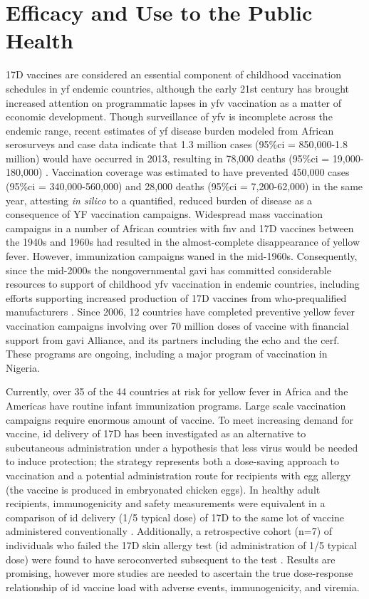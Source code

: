 \section{Efficacy and Use to the Public Health}
17D vaccines are considered an essential component of childhood vaccination schedules in \gls{yf} endemic countries, although the early 21st century has brought increased attention on programmatic lapses in \gls{yfv} vaccination as a matter of economic development. Though surveillance of \gls{yfv} is incomplete across the endemic range, recent estimates of \gls{yf} disease burden modeled from African serosurveys and case data indicate that 1.3 million cases (95\%\gls{ci} = 850,000-1.8 million) would have occurred in 2013, resulting in 78,000 deaths (95\%\gls{ci} = 19,000-180,000)  \parencite{Garske:2014dp}. Vaccination coverage was estimated to have prevented 450,000 cases (95\%\gls{ci} = 340,000-560,000) and 28,000 deaths (95\%\gls{ci} = 7,200-62,000) in the same year, attesting \emph{in silico} to a quantified, reduced burden of disease as a consequence of YF vaccination campaigns. Widespread mass vaccination campaigns in a number of African countries with \gls{fnv} and 17D vaccines between the 1940s and 1960s had resulted in the almost-complete disappearance of yellow fever. However, immunization campaigns waned in the mid-1960s. Consequently, since the mid-2000s the nongovernmental \gls{gavi} has committed considerable resources to support of childhood \gls{yfv} vaccination in endemic countries, including efforts supporting increased production of 17D vaccines from \gls{who}-prequalified manufacturers \parencite{GAVI:C4b7wMHq}. Since 2006, 12 countries have completed preventive yellow fever vaccination campaigns involving over 70 million doses of vaccine with financial support from \gls{gavi} Alliance, and its partners including the \gls{echo} and the \gls{cerf}. These programs are ongoing, including a major program of vaccination in Nigeria. 

Currently, over 35 of the 44 countries at risk for yellow fever in Africa and the Americas have routine infant immunization programs. Large scale vaccination campaigns require enormous amount of vaccine. To meet increasing demand for vaccine, \gls{id} delivery of 17D has been investigated as an alternative to subcutaneous administration under a hypothesis that less virus would be needed to induce protection; the strategy represents both a dose-saving approach to vaccination and a potential administration route for recipients with egg allergy (the vaccine is produced in embryonated chicken eggs). In healthy adult recipients, immunogenicity and safety measurements were equivalent in a comparison of \gls{id} delivery (1/5 typical dose) of 17D to the same lot of vaccine administered conventionally \parencite{Roukens:2008dc}. Additionally, a retrospective cohort (n=7) of individuals who failed the 17D skin allergy test (\gls{id} administration of 1/5 typical dose) were found to have seroconverted subsequent to the test \parencite{Roukens:2009fu}. Results are promising, however more studies are needed to ascertain the true dose-response relationship of \gls{id} vaccine load with adverse events, immunogenicity, and viremia.

